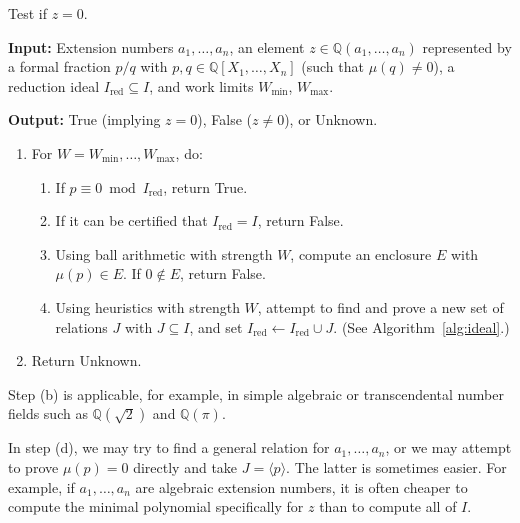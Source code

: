 \documentclass[11pt,a4paper]{article}
\begin{document}
\begin{algorithm}
\caption{Test if $z = 0$.}

\SetAlgoLined

\textbf{Input:} Extension numbers $a_1,\ldots,a_n$, an element $z \in \mathbb{Q}(a_1,\ldots,a_n)$
represented by a formal fraction $p / q$ with $p, q \in \mathbb{Q}[X_1,\ldots,X_n]$ (such that $\mu(q) \ne 0$),
a reduction ideal $I_{\text{red}} \subseteq I$, and work limits $W_{\text{min}}$, $W_{\text{max}}$.

\textbf{Output:} True (implying $z = 0$), False ($z \ne 0$), or Unknown.

\vspace*{-0.15cm}
\hrulefill
\vspace*{-0.1cm}

\begin{enumerate}

\item For $W = W_{\text{min}}, \ldots, W_{\text{max}}$, do:
\begin{enumerate}
\item If $p \equiv 0 \bmod I_{\text{red}}$, return True.
\item If it can be certified that $I_{\text{red}} = I$, return False.
\item Using ball arithmetic with strength $W$, compute an enclosure $E$ with $\mu(p) \in E$. If $0 \not\in E$, return False.
\item Using heuristics with strength $W$, attempt to find and prove a new set of relations $J$ with $J \subseteq I$, and set $I_{\text{red}} \gets I_{\text{red}} \cup J$. (See Algorithm~\ref{alg:ideal}.)
\end{enumerate}
\item Return Unknown.
\end{enumerate}

\label{alg:decision}
\end{algorithm}

Step (b) is applicable, for example, in simple algebraic or transcendental number
fields such as $\mathbb{Q}(\sqrt{2})$ and $\mathbb{Q}(\pi)$.

In step (d), we may try to find a general relation
for $a_1,\ldots,a_n$,
or we may attempt to prove $\mu(p) = 0$ directly
and take $J = \langle p \rangle$. The latter is sometimes easier.
For example, if $a_1,\ldots,a_n$ are algebraic extension numbers,
it is often cheaper to compute the minimal polynomial
specifically for $z$ than to compute all of $I$.
\end{document}
